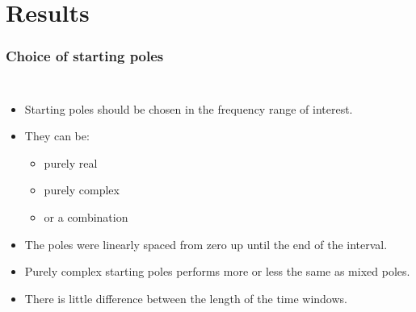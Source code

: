 \section{Results}
\begin{frame}
	\frametitle{Choice of starting poles}
		\begin{columns}[c]
			\begin{itemize}
				\item<1-> Starting poles should be chosen in the frequency range of interest.
				\item<2-> They can be:
				\begin{itemize}
					\item purely real
					\item purely complex
					\item or a combination
				\end{itemize}
				\item<3-> The poles were linearly spaced from zero up until the end of the interval.
				\item<4-> Purely complex starting poles performs more or less the same as mixed poles.
				\item<5-> There is little difference between the length of the time windows.
			\end{itemize}
\end{columns}
\end{frame}
